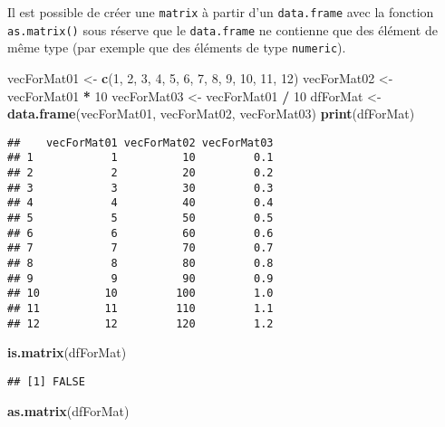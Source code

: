 \documentclass[]{book}
\newenvironment{Shaded}{\begin{snugshade}}{\end{snugshade}}
\newcommand{\KeywordTok}[1]{\textcolor[rgb]{0.13,0.29,0.53}{\textbf{#1}}}
\newcommand{\DecValTok}[1]{\textcolor[rgb]{0.00,0.00,0.81}{#1}}
\newcommand{\StringTok}[1]{\textcolor[rgb]{0.31,0.60,0.02}{#1}}
\newcommand{\OperatorTok}[1]{\textcolor[rgb]{0.81,0.36,0.00}{\textbf{#1}}}
\newcommand{\NormalTok}[1]{#1}
\theoremstyle{definition}
\theoremstyle{definition}
\theoremstyle{definition}
\theoremstyle{remark}
\begin{document}
Il est possible de créer une \texttt{matrix} à partir d'un
\texttt{data.frame} avec la fonction \texttt{as.matrix()} sous réserve
que le \texttt{data.frame} ne contienne que des élément de même type
(par exemple que des éléments de type \texttt{numeric}).

\begin{Shaded}
\begin{Highlighting}[]
\NormalTok{vecForMat01 <-}\StringTok{ }\KeywordTok{c}\NormalTok{(}\DecValTok{1}\NormalTok{, }\DecValTok{2}\NormalTok{, }\DecValTok{3}\NormalTok{, }\DecValTok{4}\NormalTok{, }\DecValTok{5}\NormalTok{, }\DecValTok{6}\NormalTok{, }\DecValTok{7}\NormalTok{, }\DecValTok{8}\NormalTok{, }\DecValTok{9}\NormalTok{, }\DecValTok{10}\NormalTok{, }\DecValTok{11}\NormalTok{, }\DecValTok{12}\NormalTok{)}
\NormalTok{vecForMat02 <-}\StringTok{ }\NormalTok{vecForMat01 }\OperatorTok{*}\StringTok{ }\DecValTok{10}
\NormalTok{vecForMat03 <-}\StringTok{ }\NormalTok{vecForMat01 }\OperatorTok{/}\StringTok{ }\DecValTok{10}
\NormalTok{dfForMat <-}\StringTok{ }\KeywordTok{data.frame}\NormalTok{(vecForMat01, vecForMat02, vecForMat03)}
\KeywordTok{print}\NormalTok{(dfForMat)}
\end{Highlighting}
\end{Shaded}

\begin{verbatim}
##    vecForMat01 vecForMat02 vecForMat03
## 1            1          10         0.1
## 2            2          20         0.2
## 3            3          30         0.3
## 4            4          40         0.4
## 5            5          50         0.5
## 6            6          60         0.6
## 7            7          70         0.7
## 8            8          80         0.8
## 9            9          90         0.9
## 10          10         100         1.0
## 11          11         110         1.1
## 12          12         120         1.2
\end{verbatim}

\begin{Shaded}
\begin{Highlighting}[]
\KeywordTok{is.matrix}\NormalTok{(dfForMat)}
\end{Highlighting}
\end{Shaded}

\begin{verbatim}
## [1] FALSE
\end{verbatim}

\begin{Shaded}
\begin{Highlighting}[]
\KeywordTok{as.matrix}\NormalTok{(dfForMat)}
\end{Highlighting}
\end{Shaded}
\end{document}
